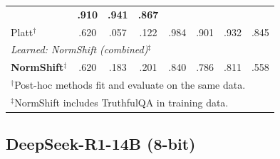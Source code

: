 \documentclass[11pt,a4paper]{article}
\begin{document}
\begin{table}[H]
\begin{tabular}{@{}lccccccc@{}}
                 & \textbf{.910} & \textbf{.941} & \textbf{.867} \\
Platt$^\dagger$          & .620 & .057 & .122 & .984
                 & .901 & .932 & .845 \\
\midrule
\multicolumn{8}{l}{\emph{Learned: NormShift (combined)$^\ddagger$}} \\
\textbf{NormShift}$^\ddagger$ & .620 & .183 & .201 & .840
                 & .786 & .811 & .558 \\
\bottomrule
\multicolumn{8}{l}{\scriptsize $^\dagger$Post-hoc methods fit and evaluate on the same data.} \\
\multicolumn{8}{l}{\scriptsize $^\ddagger$NormShift includes TruthfulQA in training data.}
\end{tabular}
\end{table}

\subsection{DeepSeek-R1-14B (8-bit)}
\label{app:calibration-deepseek-r1-14b}
\end{document}
